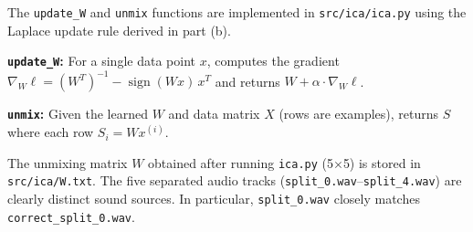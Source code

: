 \begin{answer}
The \texttt{update\_W} and \texttt{unmix} functions are implemented in \texttt{src/ica/ica.py} using the Laplace update rule derived in part (b).

\textbf{\texttt{update\_W}:} For a single data point $x$, computes the gradient $\nabla_W\ell = (W^T)^{-1} - \operatorname{sign}(Wx)\,x^T$ and returns $W + \alpha\cdot\nabla_W\ell$.

\textbf{\texttt{unmix}:} Given the learned $W$ and data matrix $X$ (rows are examples), returns $S$ where each row $S_i = W x^{(i)}$.

The unmixing matrix $W$ obtained after running \texttt{ica.py} (5$\times$5) is stored in \texttt{src/ica/W.txt}. The five separated audio tracks (\texttt{split\_0.wav}--\texttt{split\_4.wav}) are clearly distinct sound sources. In particular, \texttt{split\_0.wav} closely matches \texttt{correct\_split\_0.wav}.
\end{answer}
